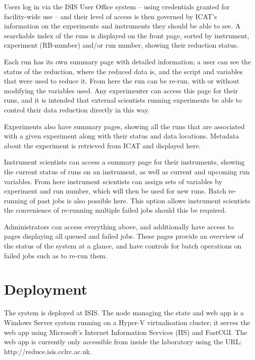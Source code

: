 \documentclass[twocolumn]{article}
\begin{document}
Users log in via the ISIS User Office system -- using credentials 
granted for facility-wide use -- and their level of access is then 
governed by ICAT's information on the experiments and instruments they 
should be able to see. A searchable index of the runs is displayed on the front page, sorted
by instrument, experiment (RB-number) and/or run number, showing their reduction
status.

Each run has its own summary page with detailed information; a user can
see the status of the reduction, where the reduced data is, and the
script and variables that were used to reduce it. From here the run can
be re-run, with or without modifying the variables used. Any
experimenter can access this page for their runs, and it is intended that
external scientists running experiments be able to control their data
reduction directly in this way.

Experiments also have summary pages, showing all the runs that are
associated with a given experiment along with their status and data
locations. Metadata about the experiment is retrieved from ICAT and
displayed here.

Instrument scientists can access a summary page for their instruments,
showing the current status of runs on an instrument, as well as current
and upcoming run variables. From here instrument scientists can assign
sets of variables by experiment and run number, which will then be used
for new runs. Batch re-running of past jobs
is also possible here. This option allows instrument scientists
the convenience of re-running multiple failed jobs should this be required. 

Administrators can access everything above, and additionally have access
to pages displaying all queued and failed jobs. These pages provide an
overview of the status of the system at a glance, and have controls for
batch operations on failed jobs such as to re-run them.

\section{Deployment}\label{deployment}

The system is deployed at ISIS. The node managing
the state and web app is a Windows Server system running on a 
Hyper-V\cite{hyper-v} virtualisation cluster; it serves the web app using
Microsoft's Internet Information Services (IIS)\cite{iis} and 
FastCGI\cite{fcgi}. The web app is currently only accessible from inside
the laboratory using the URL: http://reduce.isis.cclrc.ac.uk. 
\end{document}
